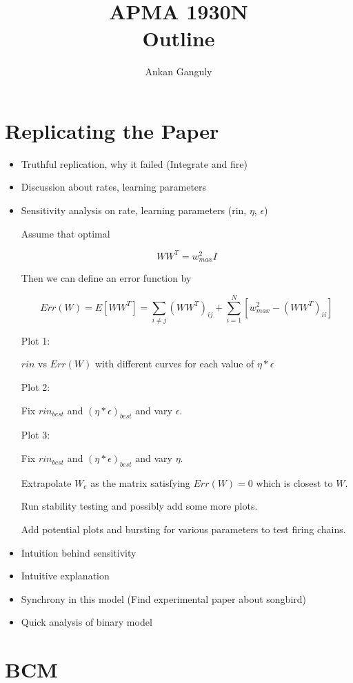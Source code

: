 \documentclass[12pt]{article}
\begin{document}
\newtheorem{lem}{Lemma}
\newtheorem{prop}{Proposition}
\newtheorem{defn}{Definition}
\newtheorem{exa}{Example}
\newtheorem{thm}{Theorem}


\newcommand{\solution}{
\skipLine

\textit{Solution: }}
\newcommand{\skipLine}{\vspace{12pt}}
\newcommand{\mc}{\mathcal}
\newcommand{\mb}{\mathbb}
\newcommand{\defeq}{:=}
\newcommand{\sm}{\setminus}
\newcommand{\limarg}[1]{\lim_{#1 \rightarrow\infty}}
\newcommand{\ms}{\mathscr}
\newcommand{\vspan}{\text{span}}
\newcommand{\ra}{\rightarrow}
\newcommand{\nra}{\nrightarrow}
\newcommand{\os}{\overset}
\newcommand{\ov}{\overline}
\newcommand{\supp}{\text{supp}}


\title{APMA 1930N \\ Outline}
\author{Ankan Ganguly}
\maketitle

\section{Replicating the Paper}

\begin{itemize}
\item Truthful replication, why it failed (Integrate and fire) 
\item Discussion about rates, learning parameters
\item Sensitivity analysis on rate, learning parameters (rin, \(\eta\), \(\epsilon\))

Assume that optimal

\[WW^T = w_{max}^2 I\]

Then we can define an error function by

\[Err(W) = E[WW^T] = \sum_{i \neq j} (WW^T)_{ij} + \sum_{i=1}^N [w_{max}^2 - (WW^T)_{ii}]\]

Plot 1:

\(rin\) vs \(Err(W)\) with different curves for each value of \(\eta*\epsilon\)

Plot 2:

Fix \(rin_{best}\) and \((\eta*\epsilon)_{best}\) and vary \(\epsilon\).

Plot 3:

Fix \(rin_{best}\) and \((\eta*\epsilon)_{best}\) and vary \(\eta\).

Extrapolate \(W_e\) as the matrix satisfying \(Err(W) = 0\) which is closest to \(W\).

Run stability testing and possibly add some more plots.

Add potential plots and bursting for various parameters to test firing chains.

\item Intuition behind sensitivity
\item Intuitive explanation
\item Synchrony in this model (Find experimental paper about songbird)
\item Quick analysis of binary model
\end{itemize}

\section{BCM}
\end{document}
